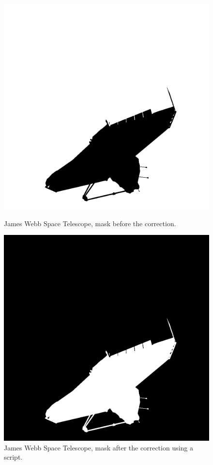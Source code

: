 \begin{figure}[h]
    \centering
    \begin{minipage}{0.45\linewidth}
        \centering
        \includegraphics[width=\linewidth]{data/mask1.png} %
        \caption{James Webb Space Telescope, mask before the correction.}
        \label{fig:mask1}
    \end{minipage}\hfill
    \begin{minipage}{0.45\linewidth}
        \centering
        \includegraphics[width=\linewidth]{data/mask2.png} %
        \caption{James Webb Space Telescope, mask after the correction using a script.}
        \label{fig:mask2}
    \end{minipage}
\end{figure}

